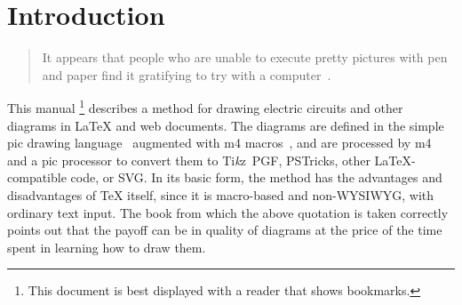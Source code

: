\newcommand{\bq}{}
\newcommand{\dpic}{{\bq dpic}\xspace}
\newcommand{\Dpic}{{\bq Dpic}\xspace}
\newcommand{\dvips}{{\bq dvips}\xspace}
\newcommand{\gpic}{{\bq gpic}\xspace}
\newcommand{\Gpic}{{\bq Gpic}\xspace}
\newcommand{\groff}{{\bq groff}\xspace}
\newcommand{\latex}{\LaTeX\xspace}
\newcommand{\linespec}{{\sl linespec}\xspace}
\newcommand{\MetaPost}{{\bq MetaPost}\xspace}
\newcommand{\Mfour}{{\bq m4}\xspace}
\newcommand{\mfpic}{{\bq mfpic}\xspace}
\newcommand{\PDF}{{\bq PDF}\xspace}
\newcommand{\pic}{{\bq pic}\xspace}
\newcommand{\Pic}{{\bq Pic}\xspace}
\newcommand{\Postscript}{{\bq Postscript}\xspace}
\newcommand{\PSTricks}{{\bq PSTricks}\xspace}
\newcommand{\SVG}{{\bq SVG}\xspace}
\newcommand{\tex}{\TeX\xspace}
\newcommand{\Textregistered}{\textregistered\xspace}
\newcommand{\TPGF}{{\bq Ti{\it k}z~PGF}\xspace}
\newcommand{\Tikz}{{\bq Ti{\it k}z}\xspace}
\newcommand{\tpic}{{\bq tpic}\xspace}
\newcommand{\xfig}{{\bq xfig}\xspace}
\newcommand{\Xfig}{{\bq Xfig}\xspace}
%
\newcommand{\xection}[1]{\section[\texorpdfstring{#1\ \dotfill}{#1}]{#1}}
\newcommand{\NVL}{\\\hspace*{\parindent}}
\newcommand{\brtt}{\hfill\break\hspace*\parindent}
\newcommand{\lbr}{{\tt\char123}}
\newcommand{\rbr}{{\tt\char125}}
\newcommand{\bsl}{{\tt\char92}}
\newcommand{\SR}[1]{\hyperref[#1]{Section~\ref*{#1}}}
\newcommand{\PR}[1]{\hyperref[#1]{page~\pageref*{#1}}}
\newcommand{\FR}[1]{\hyperref[#1]{Figure~\ref*{#1}}}
\newcommand{\FRS}[1]{\hyperref[#1]{Figures~\ref*{#1}}}
\newcommand{\MR}[2]{\hyperref[#1]{#2}}
\newcommand{\REF}[1]{\hyperref[#1]{\ref*{#1}}}
\newcommand{\LQ}{\char96}
\newcommand{\RQ}{\char39}
%
\newcommand{\Example}[1]{\vspace{\parsep}\noindent {\bf Example #1:}}
%
%
\xection{Introduction\label{Introduction:}}
   \begin{quotation}\noindent
   It appears that people
   who are unable to execute pretty pictures with pen and paper find it
   gratifying to try with a computer~\cite{Landauer95}.
   \end{quotation}

This manual%
\footnote{This document is best displayed with a reader that shows bookmarks.}
describes a method for drawing electric circuits and
other diagrams in \latex and web documents.
The diagrams are defined in the simple \pic drawing language~\cite{KRpic}
augmented with \Mfour macros~\cite{KRm4}, and are
processed by \Mfour and a \pic processor to
convert them to \TPGF, \PSTricks, other \latex-compatible code, or \SVG.
In its basic form, the method has the advantages and disadvantages of
\tex itself, since it is macro-based and non-WYSIWYG,
with ordinary text input.  The book from which the above quotation
is taken correctly points out that the payoff can be in quality of
diagrams at the price of the time spent in learning how to draw them.


